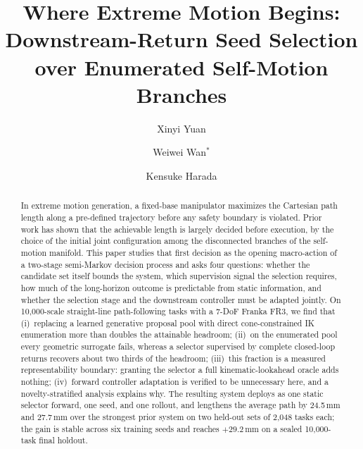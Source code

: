 \documentclass{svproc}
\begin{document}
\mainmatter

\title{Where Extreme Motion Begins: Downstream-Return Seed Selection over
Enumerated Self-Motion Branches}

\author{Xinyi Yuan
        \and Weiwei Wan$^{*}$
        \and Kensuke Harada}


\maketitle

\begin{abstract}
In extreme motion generation, a fixed-base manipulator maximizes the Cartesian
path length along a pre-defined trajectory before any safety boundary is
violated. Prior work has shown that the achievable length is largely decided
before execution, by the choice of the initial joint configuration among the
disconnected branches of the self-motion manifold. This paper studies that
first decision as the opening macro-action of a two-stage semi-Markov decision
process and asks four questions: whether the candidate set itself bounds the
system, which supervision signal the selection requires, how much of the
long-horizon outcome is predictable from static information, and whether the
selection stage and the downstream controller must be adapted jointly. On
10{,}000-scale straight-line path-following tasks with a 7-DoF Franka FR3, we
find that (i)~replacing a learned generative proposal pool with direct
cone-constrained IK enumeration more than doubles the attainable headroom;
(ii)~on the enumerated pool every geometric surrogate fails, whereas a
selector supervised by complete closed-loop returns recovers about two thirds
of the headroom; (iii)~this fraction is a measured representability boundary:
granting the selector a full kinematic-lookahead oracle adds nothing;
(iv)~forward controller adaptation is verified to be unnecessary here, and a
novelty-stratified analysis explains why. The resulting system deploys as one
static selector forward, one seed, and one rollout, and lengthens the average
path by 24.5\,mm and 27.7\,mm over the strongest prior system on two held-out
sets of 2{,}048 tasks each; the gain is stable across six training seeds and
reaches $+29.2$\,mm on a sealed 10{,}000-task final holdout.
\end{abstract}
\end{document}
